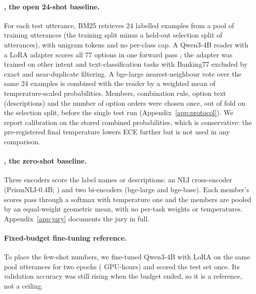 \paragraph{\orb, the open 24-shot baseline.} For each test utterance, BM25 \citep{robertson-zaragoza-2009-bm25}
retrieves 24 labelled examples from a pool of \fsPoolN{} training utterances (the training split minus a held-out
selection split of \fsSelN{} utterances), with unigram tokens and no per-class cap. A Qwen3-4B reader
\citep{yang-etal-2025-qwen3} with a LoRA adapter \citep{hu-etal-2021-lora} scores all 77 options in one forward pass
\citep{robinson-wingate-2023-mcp}; the adapter was trained on other intent and text-classification tasks with
Banking77 excluded by exact and near-duplicate filtering. A bge-large \citep{xiao-etal-2024-cpack} nearest-neighbour
vote over the same 24 examples \citep{xu-etal-2023-knn-prompting} is combined with the reader by a weighted mean of
temperature-scaled probabilities. Members, combination rule, option text (descriptions) and the number of option
orders were chosen once, out of fold on the selection split, before the single test run
(Appendix~\ref{app:protocol}). We report calibration on the stored combined probabilities, which is conservative:
the pre-registered final temperature lowers ECE further but is not used in any comparison.

\paragraph{\gj, the zero-shot baseline.} Three encoders score the label names or descriptions: an NLI cross-encoder
(PrismNLI-0.4B; \citealp{jung-etal-2025-prismatic}) and two bi-encoders (bge-large and bge-base). Each member's
scores pass through a softmax with temperature one and the members are pooled by an equal-weight geometric mean,
with no per-task weights or temperatures. Appendix~\ref{app:jury} documents the jury in full.

\paragraph{Fixed-budget fine-tuning reference.} To place the few-shot numbers, we fine-tuned Qwen3-4B with LoRA on
the same \fsPoolN{} pool utterances for two epochs (\fsFtGpuHours{} GPU-hours) and scored the test set once. Its
validation accuracy was still rising when the budget ended, so it is a reference, not a ceiling.

